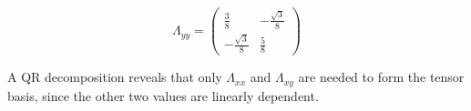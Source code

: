 \documentclass[12pt, fleqn]{article}
\begin{document}
\begin{equation}
    \Lambda_{yy}=
    \begin{pmatrix}
        \frac{3}{8}&-\frac{\sqrt{3}}{8}\\
        -\frac{\sqrt{3}}{8}&\frac{5}{8}
    \end{pmatrix}
    \label{symbasis}
\end{equation}

A QR decomposition reveals that only $\Lambda_{xx}$ and $\Lambda_{xy}$ are
needed to form the tensor basis, since the other two values are linearly dependent.
\end{document}
